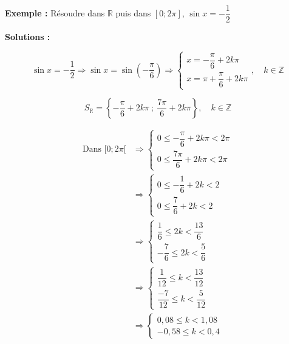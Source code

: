 \documentclass[a4paper,12pt]{article}
\begin{document}
\noindent
\textbf{Exemple :} Résoudre dans \( \mathbb{R} \) puis dans \( [0 ; 2\pi] \), \( \sin x = -\dfrac{1}{2} \)

\textbf{Solutions :}

\[
    \sin x = -\frac{1}{2} \Rightarrow \sin x = \sin\left(-\frac{\pi}{6} \right)
    \Rightarrow
    \begin{cases}
        x = -\dfrac{\pi}{6} + 2k\pi \\
        x = \pi + \dfrac{\pi}{6} + 2k\pi
    \end{cases},\quad k \in \mathbb{Z}
\]

\[
    S_{\mathbb{R}} = \left\{ -\frac{\pi}{6} + 2k\pi \ ;\ \frac{7\pi}{6} + 2k\pi \right\},\quad k \in \mathbb{Z}
\]

\[
    \begin{aligned}
        \text{Dans } [0 ; 2\pi[ & \Rightarrow
        \begin{cases}
                    0 \leq -\dfrac{\pi}{6} + 2k\pi < 2\pi \\
                    0 \leq \dfrac{7\pi}{6} + 2k\pi < 2\pi
                \end{cases}         \\[1em]
                                & \Rightarrow
        \begin{cases}
                0 \leq -\dfrac{1}{6} + 2k < 2 \\
                0 \leq \dfrac{7}{6} + 2k < 2
            \end{cases}                 \\[1em]
                                & \Rightarrow
        \begin{cases}
            \dfrac{1}{6} \leq 2k < \dfrac{13}{6} \\
            -\dfrac{7}{6} \leq 2k < \dfrac{5}{6}
        \end{cases}          \\[1em]
                                & \Rightarrow
        \begin{cases}
            \dfrac{1}{12} \leq k < \dfrac{13}{12} \\[1em]
            \dfrac{-7}{12} \leq k < \dfrac{5}{12}
        \end{cases}  \\[1em]
                                & \Rightarrow
        \begin{cases}
            0,08 \leq k < 1,08 \\[1em]
            -0,58 \leq k < 0,4
        \end{cases}                     \\[1em]

\end{aligned}\]
\end{document}
